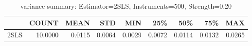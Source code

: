 \begin{table}[ht]
\centering
\caption{variance summary: Estimator=2SLS, Instruments=500, Strength=0.20}
\begin{tabular}{lrrrrrrrr}
\toprule
 & COUNT & MEAN & STD & MIN & 25\% & 50\% & 75\% & MAX \\
\midrule
2SLS & 10.0000 & 0.0115 & 0.0064 & 0.0029 & 0.0072 & 0.0114 & 0.0132 & 0.0265 \\
\bottomrule
\end{tabular}
\end{table}
